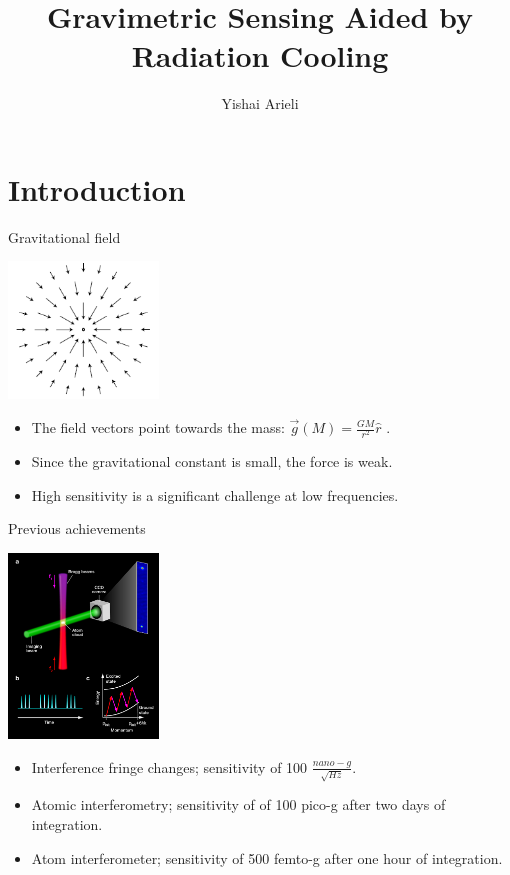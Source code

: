 \documentclass{beamer}
\title[Gravimetric Sensing Aided by Radiation Cooling]{Gravimetric Sensing Aided by Radiation Cooling}
\author[Yishai Arieli]{Yishai Arieli}
\begin{document}
	\typesetFrontSlides

\section{Introduction}



\begin{frame}{\hypertarget{frame:Gravitational field}{Gravitational field}}
	\begin{center}		
		\includegraphics[width=0.3\textwidth,keepaspectratio]{gravity.png}
    \end{center}
	\begin{itemize}
		\item The field vectors point towards the mass: $\overrightarrow{g}(M) = \frac{GM}{r^2}\hat{r}$ .
		\item Since the gravitational constant is small, the force is weak.
		\item High sensitivity is a significant challenge at low frequencies.
		\end{itemize}
\end{frame}

\begin{frame}{Previous achievements}
	\begin{center}		
		\includegraphics[width=0.3\textwidth,keepaspectratio]{kasevich.png}
	\end{center}
	\begin{itemize}

		\item Interference fringe changes; sensitivity of 100 $\frac{nano-g}{\sqrt{Hz}}$.
		\item Atomic interferometry; sensitivity of of 100 pico-g after two days of integration.
		\item Atom interferometer; sensitivity of 500 femto-g after one hour of integration.
		
	\end{itemize}
\end{frame}
\end{document}
